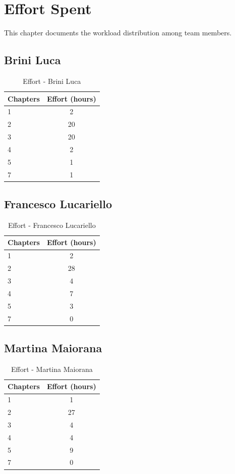 \chapter{Effort Spent}

This chapter documents the workload distribution among team members.

\section{Brini Luca}

\begin{table}[H]
\centering
\begin{tabular}{|l|c|}
\hline
\textbf{Chapters} & \textbf{Effort (hours)} \\ \hline
1 & 2 \\ \hline
2 & 20 \\ \hline
3 & 20 \\ \hline
4 & 2 \\ \hline
5 & 1 \\ \hline
7 & 1 \\ \hline
\end{tabular}
\caption{Effort - Brini Luca}
\label{tab:effort_brini}
\end{table}

\section{Francesco Lucariello}

\begin{table}[H]
\centering
\begin{tabular}{|l|c|}
\hline
\textbf{Chapters} & \textbf{Effort (hours)} \\ \hline
1 & 2 \\ \hline
2 & 28 \\ \hline
3 & 4 \\ \hline
4 & 7 \\ \hline
5 & 3 \\ \hline
7 & 0 \\ \hline
\end{tabular}
\caption{Effort - Francesco Lucariello}
\label{tab:effort_lucariello}
\end{table}

\section{Martina Maiorana}

\begin{table}[H]
\centering
\begin{tabular}{|l|c|}
\hline
\textbf{Chapters} & \textbf{Effort (hours)} \\ \hline
1 & 1 \\ \hline
2 & 27 \\ \hline
3 & 4 \\ \hline
4 & 4 \\ \hline
5 & 9 \\ \hline
7 & 0 \\ \hline
\end{tabular}
\caption{Effort - Martina Maiorana}
\label{tab:effort_maiorana}
\end{table}
